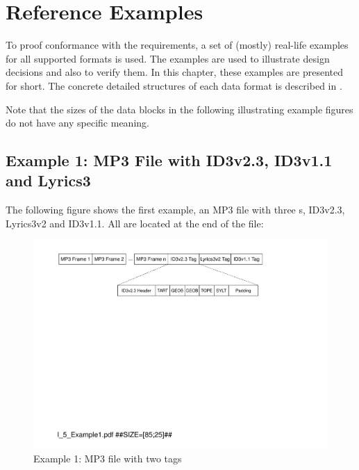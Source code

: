 
\chapter{Reference Examples}
\label{sec:ReferenceExamples}

To proof conformance with the \LibName{} requirements, a set of (mostly) real-life examples for all supported formats is used. The examples are used to illustrate design decisions and also to verify them. In this chapter, these examples are presented for short. The concrete detailed structures of each data format is described in \cite{MC17}.

Note that the sizes of the data blocks in the following illustrating example figures do not have any specific meaning.


\section{Example 1: MP3 File with ID3v2.3, ID3v1.1 and Lyrics3}
\label{sec:Example1MP3FileWithID3v23AndID3v11}

The following figure shows the first example, an MP3 file with three \TERMtag{}s, ID3v2.3, Lyrics3v2 and ID3v1.1. All are located at the end of the file:

\begin{figure}[H]
\centering
\includegraphics[width=1.00\textwidth]{figures/I_Example1.pdf}
\caption{Example 1: MP3 file with two tags}
\label{fig:Example1MP3filewithtwotags}
\end{figure}

